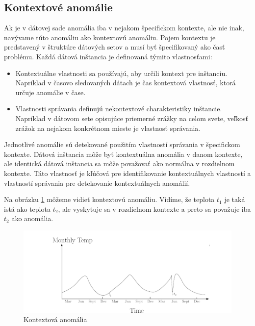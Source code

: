 \subsection{Kontextové anomálie}
Ak je v dátovej sade anomália iba v nejakom špecifickom kontexte, ale nie inak, navývame túto anomáliu ako kontextovú anomáliu. Pojem kontextu je predstavený v štruktúre dátových setov a musí byť špecifikovaný ako časť problému. Každá dátová inštancia je definovaná týmito vlastnosťami:
\begin{itemize}
    \item Kontextuálne vlastnosti sa používajú, aby určili kontext pre inštanciu. Napríklad v časovo sledovaných dátach je čas kontextová vlastnosť, ktorá určuje anomálie v čase.
    \item Vlastnosti správania definujú nekontextové charakteristiky inštancie. Napríklad v dátovom sete opisujúce priemerné zrážky na celom svete, veľkosť zrážok na nejakom konkrétnom mieste je vlastnosť správania.
\end{itemize}
Jednotlivé anomálie sú detekované použitím vlastností správania v špecifickom kontexte. Dátová inštancia môže byť kontextuálna anomália v danom kontexte, ale identická dátová inštancia sa môže považovať ako normálna v rozdielnom kontexte. Táto vlastnosť je kľúčová pre identifikovanie kontextuálnych vlastností a vlastností správania pre detekovanie kontextuálnych anomálií.\par
Na obrázku \ref{kontext} môžeme vidieť kontextovú anomáliu. Vidíme, že teplota $t_1$ je taká istá ako teplota $t_2$, ale vyskytuje sa v rozdielnom kontexte a preto sa považuje iba $t_2$ ako anomália.\cite{Chandola}
 \begin{figure}[!ht]
 \includegraphics[width=1\textwidth]{obrazky-figures/kontext.png}
\caption{Kontextová anomália\cite{Chandola}}
\centering
\label{kontext}
\end{figure}

